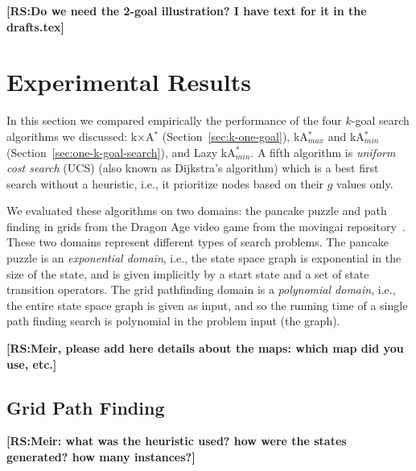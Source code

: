 \documentclass{aicom2e}
\newcommand{\kgs}{$k$-goal search}
\newcommand{\astar}{A$^*$}
\newcommand{\kastar}{kA$^*$}
\newcommand{\kastarmin}{kA$^*_{min}$}
\newcommand{\kastarmax}{kA$^*_{max}$}
\newcommand{\kxastar}{k$\times$A$^*$}
\newcommand{\minf}{Min-f}
\newcommand{\roni}[1]{\textbf{[RS:#1]}}
\begin{document}
\roni{Do we need the 2-goal illustration? I have text for it in the drafts.tex}
\section{Experimental Results}



In this section we compared empirically the performance of the four \kgs{}
algorithms we discussed: 
\kxastar{} (Section~\ref{sec:k-one-goal}), 
\kastarmax{} and \kastarmin{}(Section~\ref{sec:one-k-goal-search}),  
and Lazy \kastarmin{}. A fifth algorithm is {\em uniform cost search} (UCS) (also known
as Dijkstra's algorithm) which is a best first search without a heuristic,
i.e., it prioritize nodes based on their $g$ values only.


We evaluated these algorithms on two domains: the pancake puzzle and path finding in grids from the Dragon Age video game from the movingai repository~\cite{sturtevant2012benchmarks}. These two domains represent different types of search problems. The pancake puzzle is an {\em exponential domain}, i.e., the state space graph is exponential in the size of the state, and is given implicitly by a start state and a set of state transition operators. The grid pathfinding domain is a {\em polynomial domain}, i.e., the entire state space graph is given as input, and so the running time of a single path finding search is polynomial in the problem input (the graph). 

\roni{Meir, please add here details about the maps: which map did you use, etc.}
\subsection{Grid Path Finding}
\roni{Meir: what was the heuristic used? how were the states generated? how many instances?}
\end{document}
